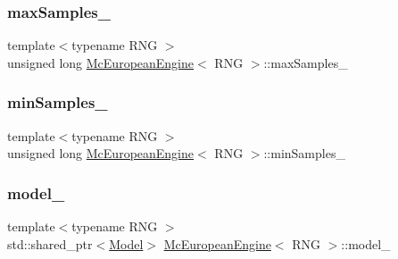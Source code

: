 \subsubsection{\texorpdfstring{max\+Samples\+\_\+}{maxSamples\_}}
{\footnotesize\ttfamily template$<$typename R\+NG $>$ \\
unsigned long \hyperlink{class_mc_european_engine}{Mc\+European\+Engine}$<$ R\+NG $>$\+::max\+Samples\+\_\+\hspace{0.3cm}{\ttfamily [private]}}

\hypertarget{class_mc_european_engine_a1fc3ac7c29f0ebb565d4f3a6a0baa315}{}\label{class_mc_european_engine_a1fc3ac7c29f0ebb565d4f3a6a0baa315} 
\subsubsection{\texorpdfstring{min\+Samples\+\_\+}{minSamples\_}}
{\footnotesize\ttfamily template$<$typename R\+NG $>$ \\
unsigned long \hyperlink{class_mc_european_engine}{Mc\+European\+Engine}$<$ R\+NG $>$\+::min\+Samples\+\_\+\hspace{0.3cm}{\ttfamily [private]}}

\hypertarget{class_mc_european_engine_a81d241a7b2c065d2ecb9c8ed367f65b6}{}\label{class_mc_european_engine_a81d241a7b2c065d2ecb9c8ed367f65b6} 
\subsubsection{\texorpdfstring{model\+\_\+}{model\_}}
{\footnotesize\ttfamily template$<$typename R\+NG $>$ \\
std\+::shared\+\_\+ptr$<$\hyperlink{class_model}{Model}$>$ \hyperlink{class_mc_european_engine}{Mc\+European\+Engine}$<$ R\+NG $>$\+::model\+\_\+\hspace{0.3cm}{\ttfamily [private]}}

\hypertarget{class_mc_european_engine_aa2e85e2348747a35494677719b023991}{}\label{class_mc_european_engine_aa2e85e2348747a35494677719b023991} 
